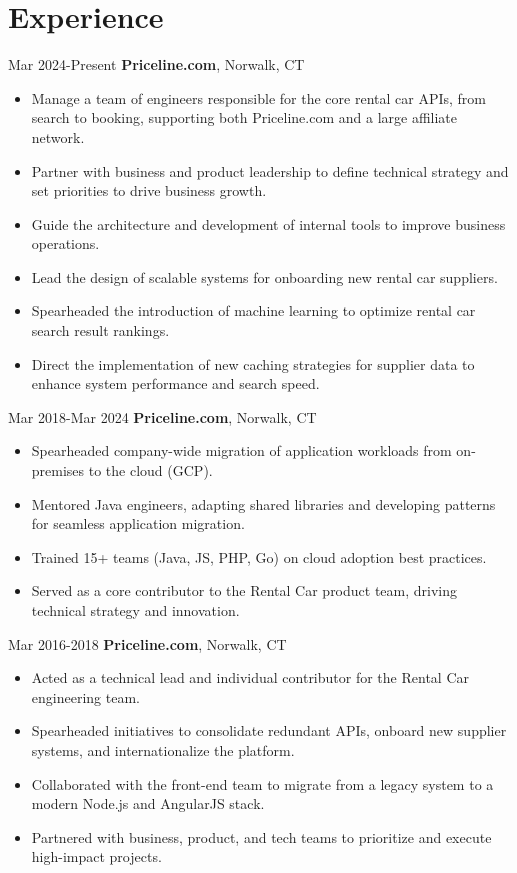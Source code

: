 \documentclass[a4paper,online]{adcv}
\begin{document}
\section{Experience}
\begin{adcvtabletwo}
   {Mar 2024-Present}
  {\textbf{Priceline.com}, Norwalk, CT}
  \begin{itemize}
    \item Manage a team of engineers responsible for the core rental car APIs, from search to booking, supporting both Priceline.com and a large affiliate network.
    \item Partner with business and product leadership to define technical strategy and set priorities to drive business growth.
    \item Guide the architecture and development of internal tools to improve business operations.
    \item Lead the design of scalable systems for onboarding new rental car suppliers.
    \item Spearheaded the introduction of machine learning to optimize rental car search result rankings.
    \item Direct the implementation of new caching strategies for supplier data to enhance system performance and search speed.
  \end{itemize}
  \adcvrowskip
  \adcvrowskip

   {Mar 2018-Mar 2024}
  {\textbf{Priceline.com}, Norwalk, CT}
  \begin{itemize}
    \item Spearheaded company-wide migration of application workloads from on-premises to the cloud (GCP).
    \item Mentored Java engineers, adapting shared libraries and developing patterns for seamless application migration.
    \item Trained 15+ teams (Java, JS, PHP, Go) on cloud adoption best practices.
    \item Served as a core contributor to the Rental Car product team, driving technical strategy and innovation.
  \end{itemize}

  \adcvrowskip
  \adcvrowskip
   {Mar 2016-2018}
  {\textbf{Priceline.com}, Norwalk, CT}
  \begin{itemize}
    \item Acted as a technical lead and individual contributor for the Rental Car engineering team.
    \item Spearheaded initiatives to consolidate redundant APIs, onboard new supplier systems, and internationalize the platform.
    \item Collaborated with the front-end team to migrate from a legacy system to a modern Node.js and AngularJS stack.
    \item Partnered with business, product, and tech teams to prioritize and execute high-impact projects.
  \end{itemize}
  \adcvrowskip


\end{adcvtabletwo}
\end{document}
